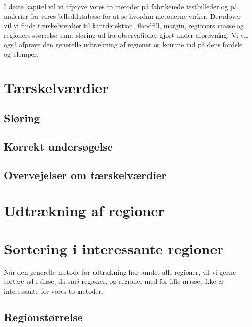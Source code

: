 {
{\sffamily
I dette kapitel vil vi afprøve vores to metoder på fabrikerede
testbilleder og på malerier fra vores billeddatabase for at se hvordan
metoderne virker. Derudover vil vi finde tærskelværdier til
kantdetektion, floodfill, margin, regioners masse og regioners størrelse
samt sløring ud fra observationer gjort under afprøvning. Vi vil også
afprøve den generelle udtrækning af regioner og komme ind på dens
fordele og ulemper.}

\section{Tærskelværdier\label{terskelverdi}}

\clearpage

\subsection{Sløring}


\subsection{Korrekt undersøgelse}


\subsection{Overvejelser om tærskelværdier}


\section{Udtrækning af regioner\label{region_detektor}}

\clearpage


\section{Sortering i interessante regioner}
{\sffamily Når den generelle metode for udtrækning har
fundet alle regioner, vil vi gerne sortere ud i disse, da små
regioner, og regioner med for lille masse, ikke er interessante for vores
to metoder.
}

\subsection{Regionstørrelse \label{region_stoerlse}}

\clearpage

}
